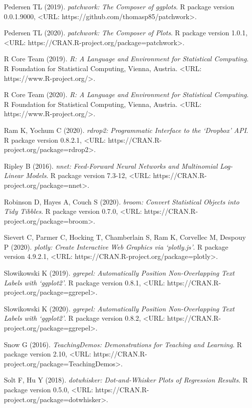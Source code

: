 \documentclass{puthesis}
\begin{document}
Pedersen TL (2019). \emph{patchwork: The Composer of ggplots}. R package
version 0.0.1.9000, \textless URL:
https://github.com/thomasp85/patchwork\textgreater.

Pedersen TL (2020). \emph{patchwork: The Composer of Plots}. R package
version 1.0.1, \textless URL:
https://CRAN.R-project.org/package=patchwork\textgreater.

R Core Team (2019). \emph{R: A Language and Environment for Statistical
Computing}. R Foundation for Statistical Computing, Vienna, Austria.
\textless URL: https://www.R-project.org/\textgreater.

R Core Team (2020). \emph{R: A Language and Environment for Statistical
Computing}. R Foundation for Statistical Computing, Vienna, Austria.
\textless URL: https://www.R-project.org/\textgreater.

Ram K, Yochum C (2020). \emph{rdrop2: Programmatic Interface to the
`Dropbox' API}. R package version 0.8.2.1, \textless URL:
https://CRAN.R-project.org/package=rdrop2\textgreater.

Ripley B (2016). \emph{nnet: Feed-Forward Neural Networks and
Multinomial Log-Linear Models}. R package version 7.3-12, \textless URL:
https://CRAN.R-project.org/package=nnet\textgreater.

Robinson D, Hayes A, Couch S (2020). \emph{broom: Convert Statistical
Objects into Tidy Tibbles}. R package version 0.7.0, \textless URL:
https://CRAN.R-project.org/package=broom\textgreater.

Sievert C, Parmer C, Hocking T, Chamberlain S, Ram K, Corvellec M,
Despouy P (2020). \emph{plotly: Create Interactive Web Graphics via
`plotly.js'}. R package version 4.9.2.1, \textless URL:
https://CRAN.R-project.org/package=plotly\textgreater.

Slowikowski K (2019). \emph{ggrepel: Automatically Position
Non-Overlapping Text Labels with `ggplot2'}. R package version 0.8.1,
\textless URL: https://CRAN.R-project.org/package=ggrepel\textgreater.

Slowikowski K (2020). \emph{ggrepel: Automatically Position
Non-Overlapping Text Labels with `ggplot2'}. R package version 0.8.2,
\textless URL: https://CRAN.R-project.org/package=ggrepel\textgreater.

Snow G (2016). \emph{TeachingDemos: Demonstrations for Teaching and
Learning}. R package version 2.10, \textless URL:
https://CRAN.R-project.org/package=TeachingDemos\textgreater.

Solt F, Hu Y (2018). \emph{dotwhisker: Dot-and-Whisker Plots of
Regression Results}. R package version 0.5.0, \textless URL:
https://CRAN.R-project.org/package=dotwhisker\textgreater.
\end{document}
